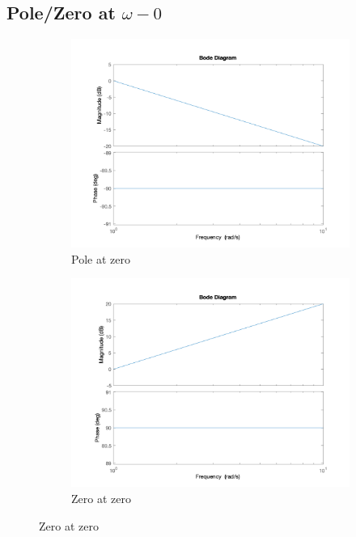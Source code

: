 \subsection*{Pole/Zero at $\omega-0$}
\begin{figure}[!h]
  \centering
  \begin{subfigure}[b]{0.45\textwidth}	
	\includegraphics[width=\textwidth]{Images/bode_pole}
	\caption{Pole at zero}
	\label{fig:bode-pole}
  \end{subfigure}
  \begin{subfigure}[b]{0.45\textwidth}	
	\includegraphics[width=\textwidth]{Images/bode_zero}
	\caption{Zero at zero}
	\label{fig:bode-zero}
  \end{subfigure}
\end{figure}
